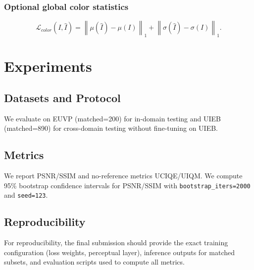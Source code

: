 \documentclass{IEEEtran}
\begin{document}
\subsubsection{Optional global color statistics}
\begin{equation}
\mathcal{L}_{color}(I,\hat{I})=\left\|\mu(\hat{I})-\mu(I)\right\|_1+\left\|\sigma(\hat{I})-\sigma(I)\right\|_1.
\end{equation}
\section{Experiments}
\subsection{Datasets and Protocol}
We evaluate on EUVP (matched=200) for in-domain testing and UIEB (matched=890) for cross-domain testing without fine-tuning on UIEB.
\subsection{Metrics}
We report PSNR/SSIM and no-reference metrics UCIQE/UIQM. We compute 95\% bootstrap confidence intervals for PSNR/SSIM with \texttt{bootstrap\_iters=2000} and \texttt{seed=123}.
\subsection{Reproducibility}
For reproducibility, the final submission should provide the exact training configuration (loss weights, perceptual layer), inference outputs for matched subsets, and evaluation scripts used to compute all metrics.
\end{document}
